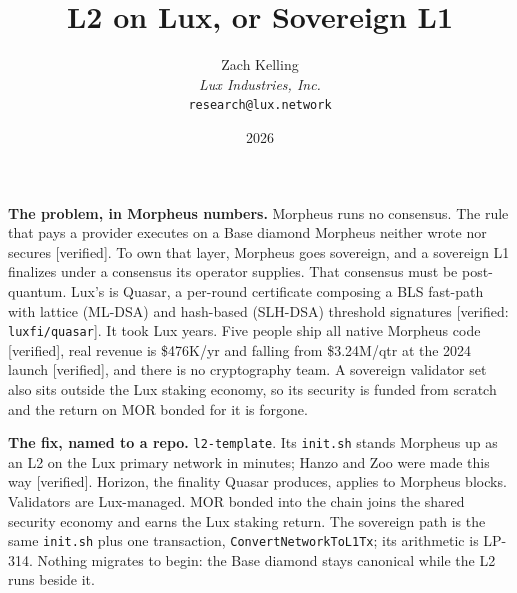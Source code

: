 \documentclass[11pt,a4paper]{article}
\title{L2 on Lux, or Sovereign L1}
\author{Zach Kelling\\\textit{Lux Industries, Inc.}\\\texttt{research@lux.network}}
\date{2026}
\newcommand{\code}[1]{\texttt{\small #1}}
\begin{document}
\luxcoverpage

\thispagestyle{empty}
\par
\vspace{0.7ex}
\par
\vspace{0.5ex}
\noindent{\color{rule}\rule{\linewidth}{1.1pt}}\par
\vspace{1.0ex}
\par
\vspace{1.4ex}

\noindent\textbf{The problem, in Morpheus numbers.}
Morpheus runs no consensus. The rule that pays a provider executes on a Base diamond Morpheus neither
wrote nor secures [verified]. To own that layer, Morpheus goes sovereign, and a sovereign L1
finalizes under a consensus its operator supplies. That consensus must be post-quantum. Lux's is
Quasar, a per-round certificate composing a BLS fast-path with lattice (ML-DSA) and hash-based
(SLH-DSA) threshold signatures [verified: \code{luxfi/quasar}]. It took Lux years. Five people ship
all native Morpheus code [verified], real revenue is \$476K/yr and falling from \$3.24M/qtr at the
2024 launch [verified], and there is no cryptography team. A sovereign validator set also sits outside
the Lux staking economy, so its security is funded from scratch and the return on MOR bonded for it is
forgone.

\vspace{0.4ex}
\noindent\textbf{The fix, named to a repo.}
\code{l2-template}. Its \code{init.sh} stands Morpheus up as an L2 on the Lux primary network in
minutes; Hanzo and Zoo were made this way [verified]. Horizon, the finality Quasar produces, applies
to Morpheus blocks. Validators are Lux-managed. MOR bonded into the chain joins the shared security
economy and earns the Lux staking return. The sovereign path is the same \code{init.sh} plus one
transaction, \code{ConvertNetworkToL1Tx}; its arithmetic is LP-314. Nothing migrates to begin: the
Base diamond stays canonical while the L2 runs beside it.
\end{document}
